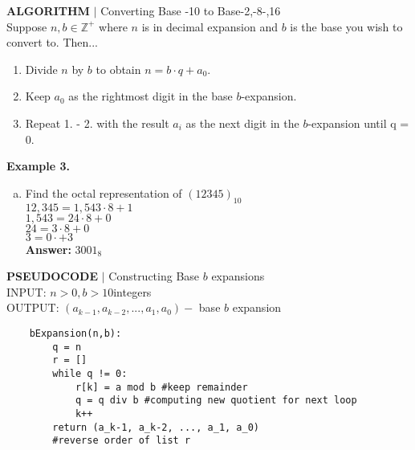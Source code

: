 \documentclass [12pt]{article}
\begin{document}
\begin{framed}
\noindent\textbf{ALGORITHM} $|$ Converting Base -10 to Base-2,-8-,16\\
Suppose $n,b\in\mathbb{Z^+}$ where $n$ is in decimal expansion and $b$ is the base you wish to convert to. Then...
\begin{enumerate}[\quad1.]
    \item Divide $n$ by $b$ to obtain $n = b\cdot q + a_0$.
    \item Keep $a_0$ as the rightmost digit in the base $b$-expansion.
    \item Repeat 1. - 2. with the result $a_i$ as the next digit in the $b$-expansion until q = 0.
\end{enumerate}
\end{framed}
\noindent\textbf{Example 3.}
\begin{enumerate}[(a)]
    \item Find the octal representation of $(12345)_{10}$\\
    \quad $12,345 = 1,543\cdot8 + 1$\\
    \quad $1,543 = 24\cdot8+0$\\
    \quad $24 = 3\cdot8+0$\\
    \quad $3 = 0\cdot+3$\\
    \quad\textbf{Answer:} $3001_8$
\end{enumerate}
\pagebreak

\begin{framed}
\noindent\textbf{PSEUDOCODE} $|$ Constructing Base $b$ expansions\\
INPUT: $n > 0,b>10$integers\\
OUTPUT: $(a_{k-1},a_{k-2},...,a_1,a_0)-$ base $b$ expansion\\
\begin{lstlisting}
    bExpansion(n,b):
        q = n
        r = []
        while q != 0:
            r[k] = a mod b #keep remainder
            q = q div b #computing new quotient for next loop
            k++
        return (a_k-1, a_k-2, ..., a_1, a_0) 
        #reverse order of list r
\end{lstlisting}
\end{framed}
\vspace{0.25in}
\end{document}
